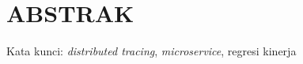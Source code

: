 \clearpage
\chapter*{ABSTRAK}



\vspace{15mm}
Kata kunci: \textit{distributed tracing}, \textit{microservice}, regresi kinerja
\clearpage